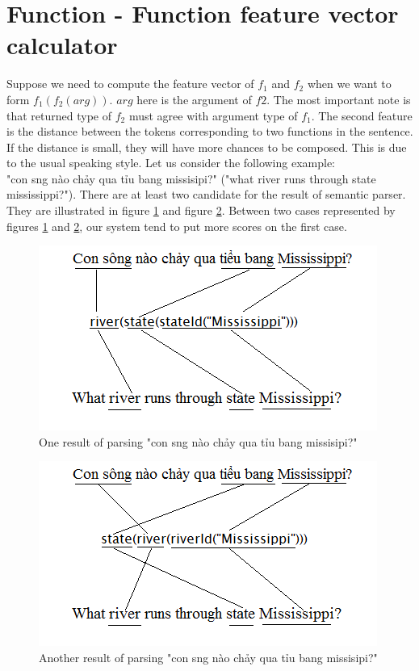 \section{Function - Function feature vector calculator}
\label{sec:model.function-function}
Suppose we need to compute the feature vector of $f_1$ and $f_2$ when we want to form $f_1(f_2(arg))$. $arg$ here is the argument of $f2$. The most important note is that returned type of $f_2$ must agree with argument type of $f_1$. The second feature is the distance between the tokens corresponding to two functions in the sentence. If the distance is small, they will have more chances to be composed. This is due to the usual speaking style. Let us consider the following example: \\
 "{\selectfont con s\ocircumflex ng n\`ao ch\h{a}y qua ti\h\ecircumflex u bang missisipi?" ("what river runs through state mississippi?")}. There are at least two candidate for the result of semantic parser. They are illustrated in figure \ref{f-f.eg1} and figure \ref{f-f.eg2}. Between two cases represented by figures \ref{f-f.eg1} and \ref{f-f.eg2}, our system tend to put more scores on the first case.
\begin{figure}[ht!]
\centering
\includegraphics{eg-function-function-mapping1.png}
\caption{One result of parsing "{\selectfont con s\ocircumflex ng n\`ao ch\h{a}y qua ti\h\ecircumflex u bang missisipi?}"}
\label{f-f.eg1}
\end{figure}

\begin{figure}[ht!]
\centering
\includegraphics{eg-function-function-mapping2.png}
\caption{Another result of parsing "{\selectfont con s\ocircumflex ng n\`ao ch\h{a}y qua ti\h\ecircumflex u bang missisipi?}"}
\label{f-f.eg2}
\end{figure}

